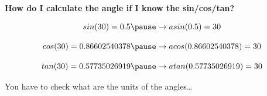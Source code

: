 \documentclass[]{beamer}
\begin{document}
  \begin{frame}

   \textbf{How do I calculate the angle if I know the sin/cos/tan?}
   \vspace{3mm}

\begin{equation*}
   sin(30)=0.5\pause \rightarrow asin(0.5)= 30
\end{equation*}
\pause

\begin{equation*}
   cos(30)=0.86602540378\pause \rightarrow acos(0.86602540378)= 30
\end{equation*}

\pause

\begin{equation*}
   tan(30)=0.57735026919\pause \rightarrow atan(0.57735026919)= 30
\end{equation*}
\pause

You have to check what are the units of the angles\dots
\end{frame}
   





































 
\end{document}
